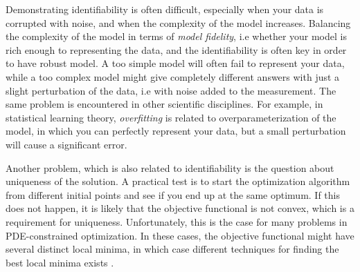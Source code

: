 Demonstrating identifiability is 
often difficult, especially when your data is corrupted with noise,
and when the complexity of the model increases. Balancing the
complexity of the model in terms of \emph{model fidelity}, i.e whether
your 
model is rich enough to representing the data, and the identifiability
is often key in order to have robust model. A too simple model will
often fail to represent your data, while a too complex model might
give completely different answers with just a slight perturbation of
the data, i.e with noise added to the measurement. The same problem is
encountered in other scientific disciplines. For example, in
statistical learning theory, \emph{overfitting} is related to
overparameterization of the model, in which you can perfectly
represent your data, but a small perturbation will cause a significant
error.

Another problem, which is also related to identifiability is
the question about uniqueness of the solution. A practical test is to
start the optimization algorithm from different initial points and see
if you end up at the same optimum. If this does not happen, it is
likely that the objective functional is not convex, which is a
requirement for uniqueness. Unfortunately, this is the case for many
problems in PDE-constrained optimization. In these cases, the objective
functional might have several distinct local minima, in which case
different techniques for finding the best local minima exists
\cite{farrell2015multiple}. 










